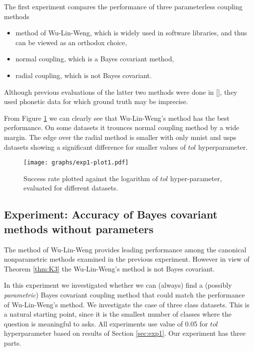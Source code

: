 The first experiment compares the performance of three parameterless coupling methods
\begin{itemize}
\item method of Wu-Lin-Weng, which is widely used in software libraries, and thus can be viewed as an orthodox choice,
\item normal coupling, which is a Bayes covariant method,
\item radial coupling, which is not Bayes covariant.
\end{itemize}

Although previous evaluations of the latter two methods were done in [\cite{vsuch2016bayes}], they used phonetic data for which ground truth may be imprecise. 

% 

From Figure \ref{fig:exp1-plot1} we can clearly see that Wu-Lin-Weng's method has the best performance. On some datasets it trounces normal coupling method by a wide margin. The edge over the radial method is smaller with only mnist and usps datasets showing a significant difference for smaller values of $tol$ hyperparameter. 

\begin{figure}
	\texttt{[image: graphs/exp1-plot1.pdf]}
	\caption{Success rate plotted against the logarithm of $tol$ hyper-parameter, evaluated for different datasets.}
	\label{fig:exp1-plot1}
\end{figure}

\subsection{Experiment: Accuracy of Bayes covariant methods without parameters}
 \label{sec:exp2}

The method of Wu-Lin-Weng provides leading performance among the canonical {nonparametric} methods examined in the previous experiment. However in view of Theorem \ref{thm:K3} the Wu-Lin-Weng's method is not Bayes covariant. 

In this experiment we investigated whether we can (always) find  a (possibly \emph{parametric}) Bayes covariant coupling method that could match the performance of Wu-Lin-Weng's method. We investigate  the case of three class datasets. This is a natural starting point, since it is the smallest number of classes where the question is meaningful to asks. All experiments use value of 0.05 for $tol$ hyperparameter based on results of Section \ref{sec:exp1}. Our experiment has three parts. 



